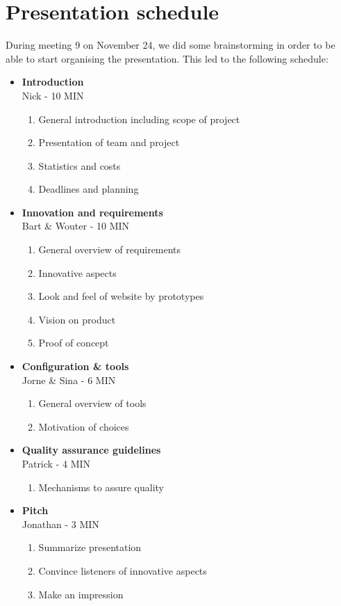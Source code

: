 \documentclass[a4paper, 12pt]{article}
\begin{document}
\section{Presentation schedule}

During meeting 9 on November 24, we did some brainstorming in order to be able to start organising the presentation. This led to the following schedule:

\begin{itemize}
	
	\item \textbf{Introduction} \\ Nick - 10 MIN
	\begin{enumerate}
		\item General introduction including scope of project
		\item Presentation of team and project
		\item Statistics and costs
		\item Deadlines and planning
	\end{enumerate}
	
	\item \textbf{Innovation and requirements} \\ Bart \& Wouter - 10 MIN
	\begin{enumerate}
		\item General overview of requirements
		\item Innovative aspects
		\item Look and feel of website by prototypes
		\item Vision on product
		\item Proof of concept
	\end{enumerate}
	
	\item \textbf{Configuration \& tools} \\ Jorne \& Sina - 6 MIN
	\begin{enumerate}
		\item General overview of tools
		\item Motivation of choices
	\end{enumerate}
	
	\item \textbf{Quality assurance guidelines} \\ Patrick - 4 MIN
	\begin{enumerate}
		\item Mechanisms to assure quality
	\end{enumerate}
	
	\item \textbf{Pitch} \\ Jonathan - 3 MIN
	\begin{enumerate}
		\item Summarize presentation
		\item Convince listeners of innovative aspects
		\item Make an impression
	\end{enumerate}
	
\end{itemize}
\end{document}
